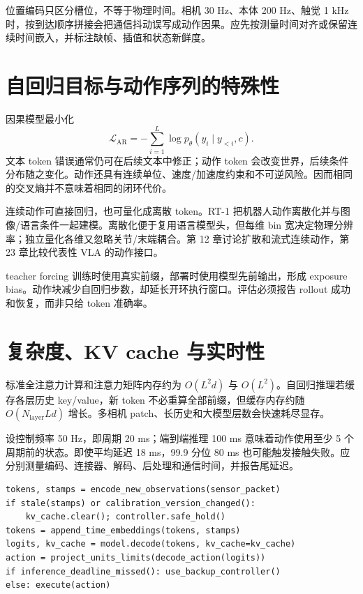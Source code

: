 位置编码只区分槽位，不等于物理时间。相机 30 Hz、本体 200 Hz、触觉 1 kHz 时，按到达顺序拼接会把通信抖动误写成动作因果。应先按测量时间对齐或保留连续时间嵌入，并标注缺帧、插值和状态新鲜度。

\section{自回归目标与动作序列的特殊性}

因果模型最小化
\begin{equation}
\mathcal L_{\mathrm{AR}}=-\sum_{i=1}^{L}
\log p_\theta(y_i\mid y_{<i},c).
\label{eq:autoregressive-loss}
\end{equation}
文本 token 错误通常仍可在后续文本中修正；动作 token 会改变世界，后续条件分布随之变化。动作还具有连续单位、速度/加速度约束和不可逆风险。因而相同的交叉熵并不意味着相同的闭环代价。

连续动作可直接回归，也可量化成离散 token。RT-1 把机器人动作离散化并与图像/语言条件一起建模\cite{brohan2022rt1}。离散化便于复用语言模型头，但每维 bin 宽决定物理分辨率；独立量化各维又忽略关节/末端耦合。第 12 章讨论扩散和流式连续动作，第 23 章比较代表性 VLA 的动作接口。

teacher forcing 训练时使用真实前缀，部署时使用模型先前输出，形成 exposure bias。动作块减少自回归步数，却延长开环执行窗口。评估必须报告 rollout 成功和恢复，而非只给 token 准确率。

\section{复杂度、KV cache 与实时性}

标准全注意力计算和注意力矩阵内存约为 $O(L^2d)$ 与 $O(L^2)$。自回归推理若缓存各层历史 key/value，新 token 不必重算全部前缀，但缓存内存约随 $O(N_{\mathrm{layer}}Ld)$ 增长。多相机 patch、长历史和大模型层数会快速耗尽显存。

设控制频率 50 Hz，即周期 20 ms；端到端推理 100 ms 意味着动作使用至少 5 个周期前的状态。即使平均延迟 18 ms，99.9 分位 80 ms 也可能触发接触失败。应分别测量编码、连接器、解码、后处理和通信时间，并报告尾延迟。

\begin{lstlisting}[caption={带时间戳与 KV cache 失效条件的因果推理教学伪代码}]
tokens, stamps = encode_new_observations(sensor_packet)
if stale(stamps) or calibration_version_changed():
    kv_cache.clear(); controller.safe_hold()
tokens = append_time_embeddings(tokens, stamps)
logits, kv_cache = model.decode(tokens, kv_cache=kv_cache)
action = project_units_limits(decode_action(logits))
if inference_deadline_missed(): use_backup_controller()
else: execute(action)
\end{lstlisting}

